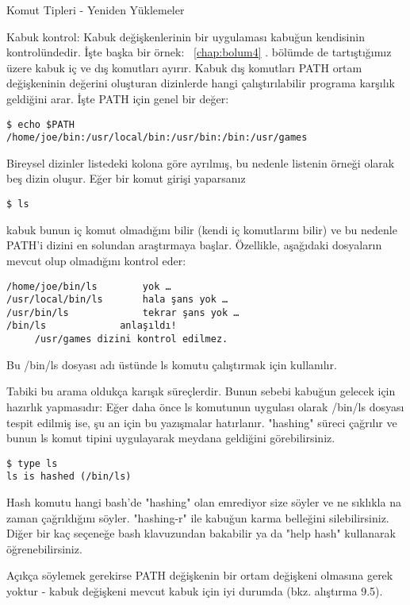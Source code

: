 \begin{section}{Komut Tipleri - Yeniden Yüklemeler}

Kabuk kontrol: Kabuk değişkenlerinin bir uygulaması kabuğun kendisinin kontrolündedir. İşte başka bir örnek: ~\ref{chap:bolum4} . bölümde de tartıştığımız üzere kabuk iç ve dış komutları ayırır. Kabuk dış komutları PATH ortam değişkeninin değerini oluşturan dizinlerde hangi çalıştırılabilir programa karşılık geldiğini arar. İşte PATH için genel bir değer:
\begin{verbatim}
$ echo $PATH
/home/joe/bin:/usr/local/bin:/usr/bin:/bin:/usr/games
\end{verbatim}

Bireysel dizinler listedeki kolona göre ayrılmış, bu nedenle listenin örneği olarak beş dizin oluşur. Eğer bir komut girişi yaparsanız
\begin{verbatim}
$ ls
\end{verbatim}

kabuk bunun iç komut olmadığını bilir (kendi iç komutlarını bilir) ve bu nedenle PATH'i dizini en solundan araştırmaya başlar. Özellikle, aşağıdaki dosyaların mevcut olup olmadığını kontrol eder:
\begin{verbatim}
/home/joe/bin/ls 		yok …
/usr/local/bin/ls 		hala şans yok …
/usr/bin/ls 			tekrar şans yok …
/bin/ls 			anlaşıldı!
     /usr/games dizini kontrol edilmez.
\end{verbatim}

Bu /bin/ls dosyası adı üstünde ls komutu çalıştırmak için kullanılır. 

Tabiki bu arama oldukça karışık süreçlerdir. Bunun sebebi kabuğun gelecek için hazırlık yapmasıdır: Eğer daha önce ls komutunun uygulası olarak /bin/ls dosyası tespit edilmiş ise, şu an için bu yazışmalar hatırlanır. "hashing" süreci çağrılır ve bunun ls komut tipini uygulayarak meydana geldiğini görebilirsiniz.
\begin{verbatim}
$ type ls
ls is hashed (/bin/ls)
\end{verbatim} 

Hash komutu hangi bash'de "hashing" olan emrediyor size söyler ve ne sıklıkla na zaman çağrıldığını söyler. "hashing-r" ile kabuğun karma belleğini 	silebilirsiniz. Diğer bir kaç seçeneğe bash klavuzundan bakabilir ya da "help hash" kullanarak öğrenebilirsiniz.

Açıkça söylemek gerekirse PATH değişkenin bir ortam değişkeni olmasına gerek yoktur - kabuk değişkeni mevcut kabuk için iyi durumda (bkz. alıştırma 9.5).


\end{section}
